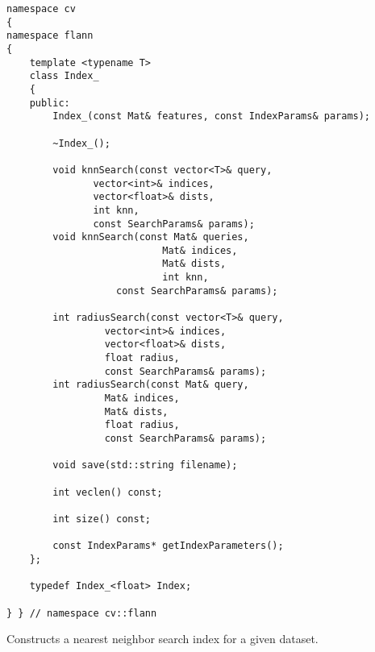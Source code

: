 \begin{lstlisting}
namespace cv
{
namespace flann
{
    template <typename T>
    class Index_ 
    {
    public:
	    Index_(const Mat& features, const IndexParams& params);

	    ~Index_();

	    void knnSearch(const vector<T>& query, 
			   vector<int>& indices, 
			   vector<float>& dists, 
			   int knn, 
			   const SearchParams& params);
	    void knnSearch(const Mat& queries, 
                           Mat& indices, 
                           Mat& dists, 
                           int knn, 
		           const SearchParams& params);

	    int radiusSearch(const vector<T>& query, 
			     vector<int>& indices, 
			     vector<float>& dists, 
			     float radius, 
			     const SearchParams& params);
	    int radiusSearch(const Mat& query, 
			     Mat& indices, 
			     Mat& dists, 
			     float radius, 
			     const SearchParams& params);

	    void save(std::string filename);

	    int veclen() const;

	    int size() const;

	    const IndexParams* getIndexParameters();
    };

    typedef Index_<float> Index;

} } // namespace cv::flann
\end{lstlisting}

Constructs a nearest neighbor search index for a given dataset.

